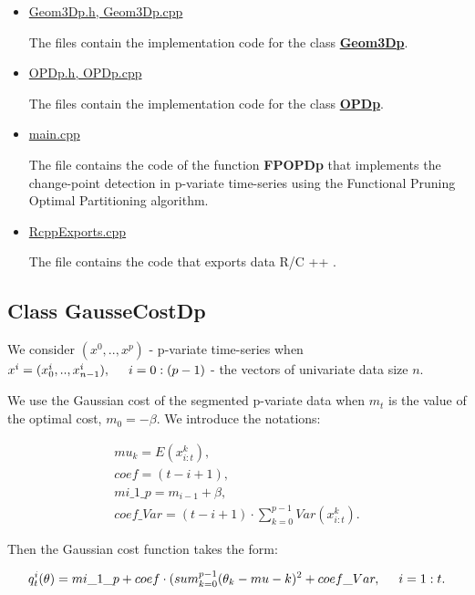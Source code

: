\documentclass{report}
\begin{document}
\begin{itemize}
\begin{itemize}
			\item \underline{Geom3Dp.h, Geom3Dp.cpp} 
			
			The files contain the implementation code for the class \hyperref [Geom3Dp]{\bfseries Geom3Dp}. 
			
			\item \underline{OPDp.h, OPDp.cpp}
			
			The files contain the implementation code for the class \hyperref [OPDp]{\bfseries OPDp}. 
			
			\item \underline{main.cpp}
			
			The file contains the code of the function {\bfseries FPOPDp} that implements the change-point detection in p-variate time-series using the Functional Pruning Optimal Partitioning algorithm.
			
			\item \underline{RcppExports.cpp} 
			
			The file contains the code that exports data R/C ++ .	
		\end{itemize}
	\end{itemize}


	\subsection*{Class  GausseCostDp}
	\label{GausseCostDp}
	
	We consider $(x^0,.., x^p)$ - p-variate time-series when $x^i = (x_0^i,..,x_{n-1}^i), \hspace*{5mm} i = 0:(p-1)$ - the vectors of univariate data size $n$.
	
	We use the Gaussian cost of the segmented p-variate data when $m_{t}$ is the value of the optimal cost, $m_{0} = -\beta $.
	We introduce the notations:
	
	\begin{equation}
		\begin{gathered}
			mu_k = E(x_{i:t}^k),\\
			coef = (t - i + 1),\\
			mi\_1\_p = m_{i-1} + \beta,\\
			coef\_Var = (t-i+1)\cdot\sum_{k = 0}^{p-1}Var(x_{i:t}^k).
		\end{gathered}
		\label{eq:coef}
	\end{equation}
	
	Then the Gaussian cost function  takes the form:
	
	\begin{equation}
		q_t^i(\theta) = mi\_1\_p+ coef\cdot(sum_{k = 0}^{p-1}(\theta_k - mu-k)^2 + coef\_Var, \hspace*{5mm} i = 1:t.
		\label{eq:costcoef}
	\end{equation}
	
\end{document}

